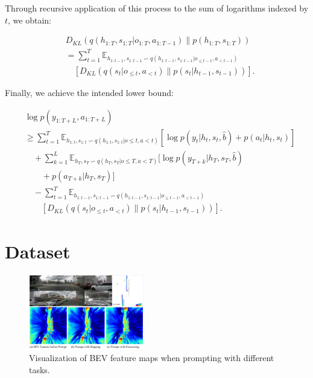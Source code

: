 Through recursive application of this process to the sum of logarithms indexed by $t$, we obtain:

\begin{footnotesize} 
	\begin{equation} \label{7}
	\begin{aligned}
	&D_{KL}(q(h_{1:T},s_{1:T}|o_{1:T},a_{1:T-1})\parallel p(h_{1:T},s_{1:T}))\\
	&=\displaystyle\sum_{t=1}^{T}\mathbb{E}_{h_{1:t-1},s_{1:t-1}\backsim q(h_{1:t-1},s_{1:t-1}|o_{\leq t-1},a_{<t-1} )}\\
	&\quad [D_{KL}(q(s_t|o_{\leq t},a_{<t})\parallel p(s_t|h_{t-1},s_{t-1}))].
	\end{aligned}
	\end{equation} 
\end{footnotesize}

Finally, we achieve the intended lower bound:

\begin{footnotesize} 
	\begin{equation} \label{8}
	\begin{aligned}
	&\log p(y_{1:T+L},a_{1:T+L}) \\
	& \geq \displaystyle\sum_{t=1}^{T}\mathbb{E}_{h_{1:t},s_{1:t}\backsim q(h_{1:t},s_{1:t}|o\leq t,a<t)}[\log p(y_t|h_t,s_t,\hat{b})+p(a_t|h_t,s_t)] \\   &\quad +\displaystyle\sum_{k=1}^{L}\mathbb{E}_{h_{T},s_{T}\backsim q(h_{T},s_{T}|o\leq T,a<T)}[\log p(y_{T+k}|h_T,s_T,\hat{b})\\
	&\qquad +p(a_{T+k}|h_T,s_T)] \\
	&\quad -\displaystyle\sum_{t=1}^{T}\mathbb{E}_{h_{1:t-1},s_{1:t-1}\backsim q(h_{1:t-1},s_{1:t-1}|o_{\leq t-1},a_{<t-1} )}\\
	&\qquad [D_{KL}(q(s_t|o_{\leq t},a_{<t})\parallel p(s_t|h_{t-1},s_{t-1}))].
	\end{aligned}
	\end{equation} 
\end{footnotesize}

\section{Dataset}  
\label{data}
\begin{figure}[t]
	\centering
	\includegraphics[width=0.45\textwidth]{figures/task} 
	\caption{Visualization of BEV feature maps when prompting with different tasks.}
	\label{fig:task}
\end{figure}

